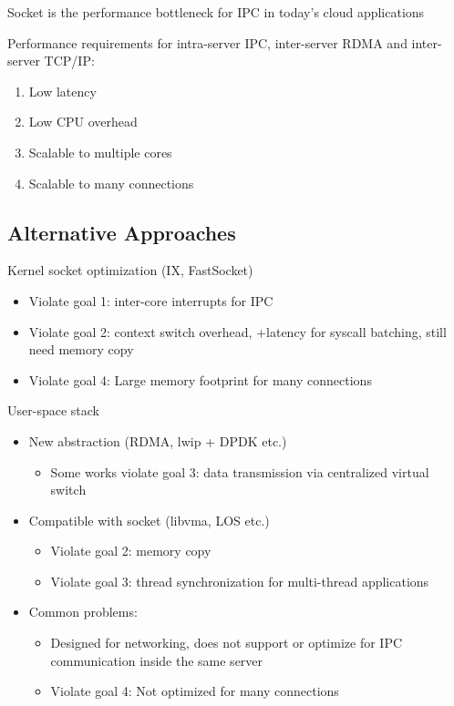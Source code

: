 Socket is the performance bottleneck for IPC in today’s cloud applications 


Performance requirements for intra-server IPC, inter-server RDMA and inter-server TCP/IP:

\begin{enumerate}
\item Low latency 
\item Low CPU overhead 
\item Scalable to multiple cores 
\item Scalable to many connections 
\end{enumerate}

\subsection{Alternative Approaches}
\label{subsec:related}

Kernel socket optimization (IX, FastSocket) 

\begin{itemize}
\item
Violate goal 1: inter-core interrupts for IPC 
\item
Violate goal 2: context switch overhead, +latency for syscall batching, still need memory copy 
\item 
Violate goal 4: Large memory footprint for many connections 
\end{itemize}

User-space stack 

\begin{itemize}
\item New abstraction (RDMA, lwip + DPDK etc.) 
\begin{itemize}
	\item Some works violate goal 3: data transmission via centralized virtual switch 
\end{itemize}
\item Compatible with socket (libvma, LOS etc.) 
\begin{itemize}
	\item Violate goal 2: memory copy 
	\item Violate goal 3: thread synchronization for multi-thread applications 
\end{itemize}
\item Common problems: 
\begin{itemize}
	\item Designed for networking, does not support or optimize for IPC communication inside the same server 
	\item Violate goal 4: Not optimized for many connections 
\end{itemize}
\end{itemize}




